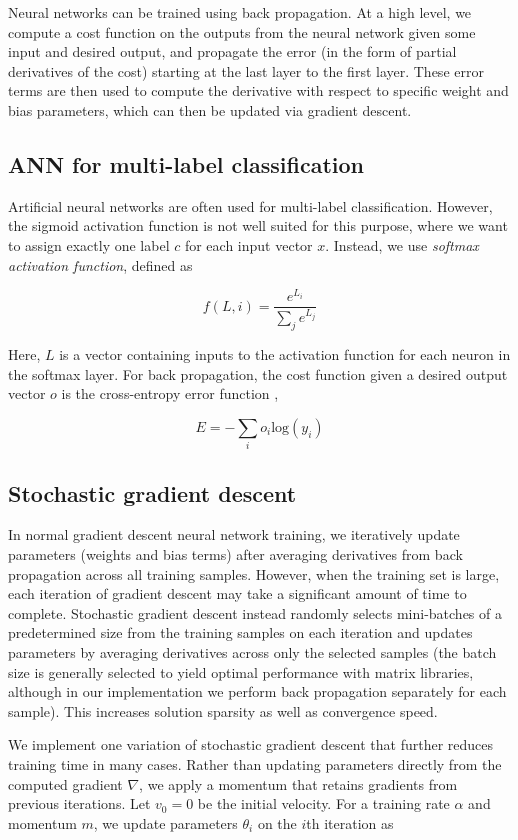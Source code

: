 \documentclass[10pt,twocolumn]{article}
\begin{document}
Neural networks can be trained using back propagation. At a high level, we compute a cost function on the outputs from the neural network given some input and desired output, and propagate the error (in the form of partial derivatives of the cost) starting at the last layer to the first layer. These error terms are then used to compute the derivative with respect to specific weight and bias parameters, which can then be updated via gradient descent.

\subsection{ANN for multi-label classification}

Artificial neural networks are often used for multi-label classification. However, the sigmoid activation function is not well suited for this purpose, where we want to assign exactly one label $c$ for each input vector $x$. Instead, we use \emph{softmax activation function}, defined as

$$f(L, i) = \frac{e^{L_i}}{\sum_j e^{L_j}}$$

Here, $L$ is a vector containing inputs to the activation function for each neuron in the softmax layer. For back propagation, the cost function given a desired output vector $o$ is the cross-entropy error function \cite{multilabelerror},

$$E = -\sum_i o_i \text{log}(y_i)$$

\subsection{Stochastic gradient descent} \label{subsec:SGD}

In normal gradient descent neural network training, we iteratively update parameters (weights and bias terms) after averaging derivatives from back propagation across all training samples. However, when the training set is large, each iteration of gradient descent may take a significant amount of time to complete. Stochastic gradient descent instead randomly selects mini-batches of a predetermined size from the training samples on each iteration and updates parameters by averaging derivatives across only the selected samples (the batch size is generally selected to yield optimal performance with matrix libraries, although in our implementation we perform back propagation separately for each sample). This increases solution sparsity as well as convergence speed.

We implement one variation of stochastic gradient descent that further reduces training time in many cases. Rather than updating parameters directly from the computed gradient $\nabla$, we apply a momentum that retains gradients from previous iterations. Let $v_0 = 0$ be the initial velocity. For a training rate $\alpha$ and momentum $m$, we update parameters $\theta_i$ on the $i$th iteration as \cite{ufldl}
\end{document}
